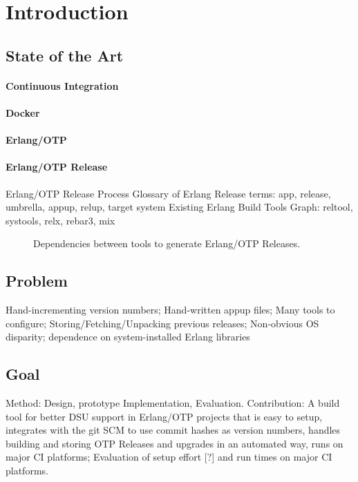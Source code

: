 \section{Introduction}

\subsection{State of the Art}

\paragraph{Continuous Integration}

\paragraph{Docker}

\paragraph{Erlang/OTP}

\paragraph{Erlang/OTP Release}
Erlang/OTP Release Process
Glossary of Erlang Release terms: app, release, umbrella, appup, relup, target system
Existing Erlang Build Tools Graph: reltool, systools, relx, rebar3, mix

\begin{figure}
  \caption{Dependencies between tools to generate Erlang/OTP Releases.}
\end{figure}


\subsection{Problem}

Hand-incrementing version numbers; Hand-written appup files; Many tools to configure; Storing/Fetching/Unpacking previous releases; Non-obvious OS disparity; dependence on system-installed Erlang libraries


\subsection{Goal}

Method: Design, prototype Implementation, Evaluation.
Contribution: A build tool for better DSU support in Erlang/OTP projects that is easy to setup, integrates with the git SCM to use commit hashes as version numbers, handles building and storing OTP Releases and upgrades in an automated way, runs on major CI platforms;
Evaluation of setup effort [?] and run times on major CI platforms.
